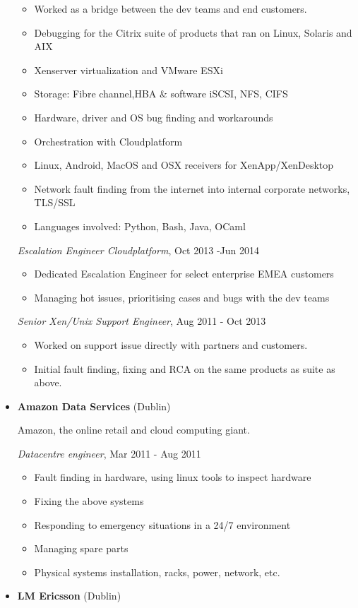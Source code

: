 \documentclass[]{article}
\providecommand{\tightlist}{%
  \setlength{\itemsep}{0pt}\setlength{\parskip}{0pt}}
\begin{document}
\begin{itemize}
  \begin{itemize}
  \tightlist
  \item
    Worked as a bridge between the dev teams and end customers.
  \item
    Debugging for the Citrix suite of products that ran on Linux,
    Solaris and AIX
  \item
    Xenserver virtualization and VMware ESXi
  \item
    Storage: Fibre channel,HBA \& software iSCSI, NFS, CIFS
  \item
    Hardware, driver and OS bug finding and workarounds
  \item
    Orchestration with Cloudplatform
  \item
    Linux, Android, MacOS and OSX receivers for XenApp/XenDesktop
  \item
    Network fault finding from the internet into internal corporate
    networks, TLS/SSL
  \item
    Languages involved: Python, Bash, Java, OCaml
  \end{itemize}

  \emph{Escalation Engineer Cloudplatform}, Oct 2013 -Jun 2014

  \begin{itemize}
  \tightlist
  \item
    Dedicated Escalation Engineer for select enterprise EMEA customers
  \item
    Managing hot issues, prioritising cases and bugs with the dev teams
    \pagebreak
  \end{itemize}

  \emph{Senior Xen/Unix Support Engineer}, Aug 2011 - Oct 2013

  \begin{itemize}
  \tightlist
  \item
    Worked on support issue directly with partners and customers.
  \item
    Initial fault finding, fixing and RCA on the same products as suite
    as above.
  \end{itemize}
\item
  \textbf{Amazon Data Services} (Dublin)

  Amazon, the online retail and cloud computing giant.

  \emph{Datacentre engineer}, Mar 2011 - Aug 2011

  \begin{itemize}
  \tightlist
  \item
    Fault finding in hardware, using linux tools to inspect hardware
  \item
    Fixing the above systems
  \item
    Responding to emergency situations in a 24/7 environment
  \item
    Managing spare parts
  \item
    Physical systems installation, racks, power, network, etc.
  \end{itemize}
\item
  \textbf{LM Ericsson} (Dublin)


\end{itemize}
\end{document}
